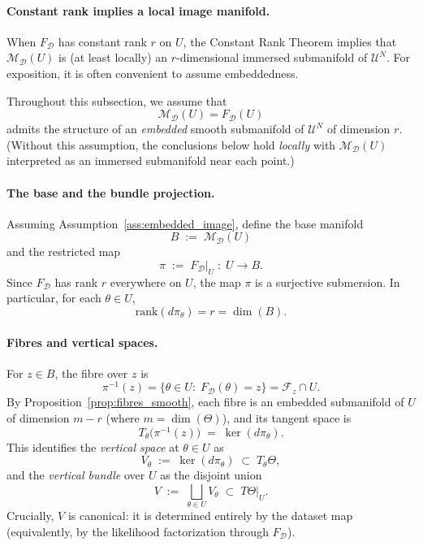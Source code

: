 \paragraph{Constant rank implies a local image manifold.}
When $F_{\mathcal D}$ has constant rank $r$ on $U$, the Constant Rank Theorem implies that
$\mathcal M_{\mathcal D}(U)$ is (at least locally) an $r$-dimensional immersed submanifold of
$\mathcal U^N$.  For exposition, it is often convenient to assume embeddedness.

\begin{gass}
\label{ass:embedded_image}
Throughout this subsection, we assume that
\[
\mathcal M_{\mathcal D}(U)=F_{\mathcal D}(U)
\]
admits the structure of an \emph{embedded} smooth submanifold of $\mathcal U^N$ of dimension $r$.
(Without this assumption, the conclusions below hold \emph{locally} with
$\mathcal M_{\mathcal D}(U)$ interpreted as an immersed submanifold near each point.)
\end{gass}

\paragraph{The base and the bundle projection.}
Assuming Assumption~\ref{ass:embedded_image}, define the base manifold
\[
B \;:=\;\mathcal M_{\mathcal D}(U)
\]
and the restricted map
\begin{equation}
\pi \;:=\; F_{\mathcal D}\big|_{U} \;:\; U \longrightarrow B.
\label{eq:bundle_projection_pi}
\end{equation}
Since $F_{\mathcal D}$ has rank $r$ everywhere on $U$, the map $\pi$ is a surjective submersion.
In particular, for each $\theta\in U$,
\[
\mathrm{rank}(d\pi_\theta)=r=\dim(B).
\]

\paragraph{Fibres and vertical spaces.}
For $z\in B$, the fibre over $z$ is
\[
\pi^{-1}(z)=\{\theta\in U:\;F_{\mathcal D}(\theta)=z\}=\mathcal F_z\cap U.
\]
By Proposition~\ref{prop:fibres_smooth}, each fibre is an embedded submanifold of $U$ of dimension
$m-r$ (where $m=\dim(\Theta)$), and its tangent space is
\[
T_\theta\bigl(\pi^{-1}(z)\bigr) \;=\; \ker(d\pi_\theta).
\]
This identifies the \emph{vertical space} at $\theta\in U$ as
\[
V_\theta \;:=\; \ker(d\pi_\theta)\;\subset\;T_\theta\Theta,
\]
and the \emph{vertical bundle} over $U$ as the disjoint union
\[
V \;:=\;\bigsqcup_{\theta\in U} V_\theta \;\subset\; T\Theta|_U.
\]
Crucially, $V$ is canonical: it is determined entirely by the dataset map (equivalently, by the
likelihood factorization through $F_{\mathcal D}$).

